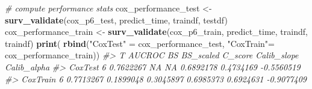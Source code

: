\documentclass[
]{article}
\newenvironment{Shaded}{\begin{snugshade}}{\end{snugshade}}
\newcommand{\CommentTok}[1]{\textcolor[rgb]{0.56,0.35,0.01}{\textit{#1}}}
\newcommand{\FunctionTok}[1]{\textcolor[rgb]{0.13,0.29,0.53}{\textbf{#1}}}
\newcommand{\NormalTok}[1]{#1}
\newcommand{\OtherTok}[1]{\textcolor[rgb]{0.56,0.35,0.01}{#1}}
\newcommand{\StringTok}[1]{\textcolor[rgb]{0.31,0.60,0.02}{#1}}
\begin{document}
\begin{Shaded}
\begin{Highlighting}[]
\CommentTok{\# compute performance stats }
\NormalTok{cox\_performance\_test }\OtherTok{\textless{}{-}} 
  \FunctionTok{surv\_validate}\NormalTok{(cox\_p6\_test, predict\_time, traindf, testdf)}
\NormalTok{cox\_performance\_train }\OtherTok{\textless{}{-}} 
  \FunctionTok{surv\_validate}\NormalTok{(cox\_p6\_train, predict\_time, traindf, traindf)}
\FunctionTok{print}\NormalTok{(}
  \FunctionTok{rbind}\NormalTok{(}\StringTok{"CoxTest"} \OtherTok{=}\NormalTok{ cox\_performance\_test,}
        \StringTok{"CoxTrain"}\OtherTok{=}\NormalTok{ cox\_performance\_train))}
\CommentTok{\#\textgreater{}          T    AUCROC        BS BS\_scaled   C\_score Calib\_slope Calib\_alpha}
\CommentTok{\#\textgreater{} CoxTest  6 0.7622267        NA        NA 0.6892178   0.4734169  {-}0.5560519}
\CommentTok{\#\textgreater{} CoxTrain 6 0.7713267 0.1899048 0.3045897 0.6985373   0.6924631  {-}0.9077409}


\end{Highlighting}
\end{Shaded}
\end{document}
